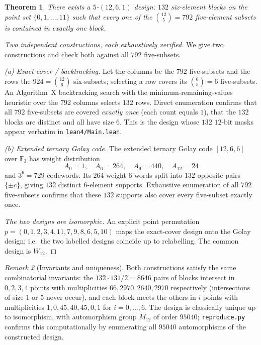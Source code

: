 \documentclass[11pt]{article}
\newtheorem{theorem}{Theorem}
\theoremstyle{definition}
\theoremstyle{remark}
\newtheorem{remark}[theorem]{Remark}
\newcommand{\Wtwelve}{W_{12}}
\begin{document}
\begin{theorem}\label{thm:existence}
There exists a $5$-$(12,6,1)$ design: $132$ six-element blocks on the point set
$\{0,1,\dots,11\}$ such that every one of the $\binom{12}{5} = 792$ five-element
subsets is contained in exactly one block.
\end{theorem}

\begin{proof}[Two independent constructions, each exhaustively verified]
We give two constructions and check both against all $792$ five-subsets.

\emph{(a) Exact cover / backtracking.} Let the columns be the $792$
five-subsets and the rows the $924 = \binom{12}{6}$ six-subsets; selecting a row
covers its $\binom{6}{5} = 6$ five-subsets. An Algorithm~X backtracking search
with the minimum-remaining-values heuristic over the $792$ columns selects $132$
rows. Direct enumeration confirms that all $792$ five-subsets are covered
\emph{exactly once} (each count equals $1$), that the $132$ blocks are distinct
and all have size $6$. This is the design whose $132$ $12$-bit masks appear
verbatim in \texttt{lean4/Main.lean}.

\emph{(b) Extended ternary Golay code.} The extended ternary Golay code
$[12,6,6]$ over $\mathbb{F}_3$ has weight distribution
\[
  A_0 = 1,\quad A_6 = 264,\quad A_9 = 440,\quad A_{12} = 24
\]
and $3^6 = 729$ codewords. Its $264$ weight-$6$ words split into $132$ opposite
pairs $\{\pm c\}$, giving $132$ distinct $6$-element supports. Exhaustive
enumeration of all $792$ five-subsets confirms that these $132$ supports also
cover every five-subset exactly once.

\emph{The two designs are isomorphic.} An explicit point permutation
$p = (0,1,2,3,4,11,7,9,8,6,5,10)$ maps the exact-cover design onto the Golay
design; i.e.\ the two labelled designs coincide up to relabelling. The common
design is $\Wtwelve$.
\end{proof}

\begin{remark}[Invariants and uniqueness]
Both constructions satisfy the same combinatorial invariants: the
$132 \cdot 131 / 2 = 8646$ pairs of blocks intersect in
$0,2,3,4$ points with multiplicities $66, 2970, 2640, 2970$ respectively
(intersections of size $1$ or $5$ never occur), and each block meets the others
in $i$ points with multiplicities $1,0,45,40,45,0,1$ for $i = 0,\dots,6$. The
design is classically unique up to isomorphism, with automorphism group
$M_{12}$ of order $95040$; \texttt{reproduce.py} confirms this computationally by
enumerating all $95040$ automorphisms of the constructed design.
\end{remark}
\end{document}
